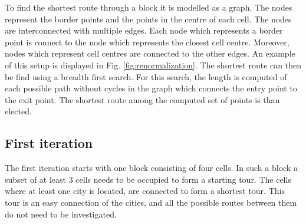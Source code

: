 To find the shortest route through a block it is modelled as a graph. The
nodes represent the border points and the points in the centre of each cell.
The nodes are interconnected with multiple edges. Each node which represents a
border point is connect to the node which represents the closest cell centre.
Moreover, nodes which represent cell centres are connected to the other edges.
An example of this setup is displayed in Fig. \ref{fig:renormalization}. The
shortest route can then be find using a breadth first search. For this search,
the length is computed of each possible path without cycles in the graph 
which connects the entry point to the exit point. The shortest route among the
computed set of points is than elected.

\subsection{First iteration}
The first iteration starts with one block consisting of four cells. In such a
block a subset of at least 3 cells needs to be occupied to form a starting
tour. The cells where at least one city is located, are connected to form a
shortest tour. This tour is an easy connection of the cities, and all the
possible routes between them do not need to be investigated.

